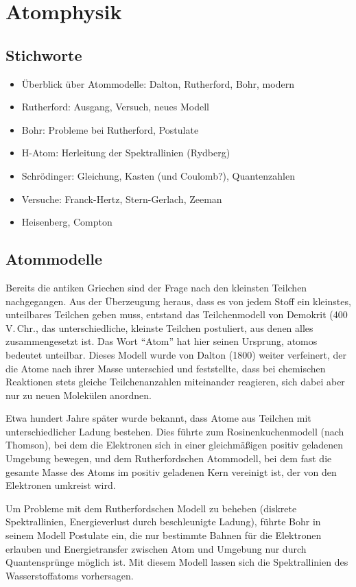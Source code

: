 \documentclass[a4paper]{scrartcl}
\begin{document}
\section{Atomphysik}

\subsection{Stichworte}
\begin{itemize}[noitemsep]
  \item Überblick über Atommodelle: Dalton, Rutherford, Bohr, modern
  \item Rutherford: Ausgang, Versuch, neues Modell
  \item Bohr: Probleme bei Rutherford, Postulate
  \item H-Atom: Herleitung der Spektrallinien (Rydberg)
  \item Schrödinger: Gleichung, Kasten (und Coulomb?), Quantenzahlen
  \item Versuche: Franck-Hertz, Stern-Gerlach, Zeeman
  \item Heisenberg, Compton
\end{itemize}

\subsection{Atommodelle}
Bereits die antiken Griechen sind der Frage nach den kleinsten Teilchen nachgegangen. Aus der Überzeugung heraus, dass es von jedem Stoff ein kleinstes, unteilbares Teilchen geben muss, entstand das Teilchenmodell von Demokrit (400 V.\,Chr., das unterschiedliche, kleinste Teilchen postuliert, aus denen alles zusammengesetzt ist. Das Wort "`Atom"' hat hier seinen Ursprung, atomos bedeutet unteilbar. Dieses Modell wurde von Dalton (1800) weiter verfeinert, der die Atome nach ihrer Masse unterschied und feststellte, dass bei chemischen Reaktionen stets gleiche Teilchenanzahlen miteinander reagieren, sich dabei aber nur zu neuen Molekülen anordnen.

Etwa hundert Jahre später wurde bekannt, dass Atome aus Teilchen mit unterschiedlicher Ladung bestehen. Dies führte zum Rosinenkuchenmodell (nach Thomson), bei dem die Elektronen sich in einer gleichmäßigen positiv geladenen Umgebung bewegen, und dem Rutherfordschen Atommodell, bei dem fast die gesamte Masse des Atoms im positiv geladenen Kern vereinigt ist, der von den Elektronen umkreist wird.

Um Probleme mit dem Rutherfordschen Modell zu beheben (diskrete Spektrallinien, Energieverlust durch beschleunigte Ladung), führte Bohr in seinem Modell Postulate ein, die nur bestimmte Bahnen für die Elektronen erlauben und Energietransfer zwischen Atom und Umgebung nur durch Quantensprünge möglich ist. Mit diesem Modell lassen sich die Spektrallinien des Wasserstoffatoms vorhersagen.
\end{document}
